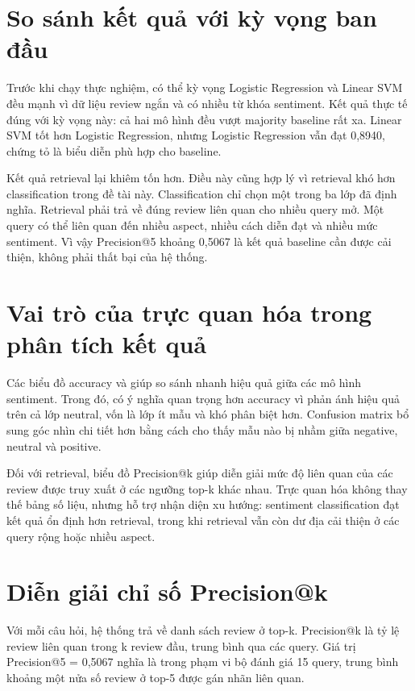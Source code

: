 \section{So sánh kết quả với kỳ vọng ban đầu}
Trước khi chạy thực nghiệm, có thể kỳ vọng Logistic Regression và Linear SVM đều mạnh vì dữ liệu review ngắn và có nhiều từ khóa sentiment. Kết quả thực tế đúng với kỳ vọng này: cả hai mô hình đều vượt majority baseline rất xa. Linear SVM tốt hơn Logistic Regression, nhưng Logistic Regression vẫn đạt \MacroFOne{} 0,8940, chứng tỏ \TFIDF{} là biểu diễn phù hợp cho baseline.

Kết quả retrieval lại khiêm tốn hơn. Điều này cũng hợp lý vì retrieval khó hơn classification trong đề tài này. Classification chỉ chọn một trong ba lớp đã định nghĩa. Retrieval phải trả về đúng review liên quan cho nhiều query mở. Một query có thể liên quan đến nhiều aspect, nhiều cách diễn đạt và nhiều mức sentiment. Vì vậy Precision@5 khoảng 0,5067 là kết quả baseline cần được cải thiện, không phải thất bại của hệ thống.

\section{Vai trò của trực quan hóa trong phân tích kết quả}
Các biểu đồ accuracy và \MacroFOne{} giúp so sánh nhanh hiệu quả giữa các mô hình sentiment. Trong đó, \MacroFOne{} có ý nghĩa quan trọng hơn accuracy vì phản ánh hiệu quả trên cả lớp neutral, vốn là lớp ít mẫu và khó phân biệt hơn. Confusion matrix bổ sung góc nhìn chi tiết hơn bằng cách cho thấy mẫu nào bị nhầm giữa negative, neutral và positive.

Đối với retrieval, biểu đồ Precision@k giúp diễn giải mức độ liên quan của các review được truy xuất ở các ngưỡng top-k khác nhau. Trực quan hóa không thay thế bảng số liệu, nhưng hỗ trợ nhận diện xu hướng: sentiment classification đạt kết quả ổn định hơn retrieval, trong khi retrieval vẫn còn dư địa cải thiện ở các query rộng hoặc nhiều aspect.

\section{Diễn giải chỉ số Precision@k}
Với mỗi câu hỏi, hệ thống trả về danh sách review ở top-k. Precision@k là tỷ lệ review liên quan trong k review đầu, trung bình qua các query. Giá trị Precision@5 = 0,5067 nghĩa là trong phạm vi bộ đánh giá 15 query, trung bình khoảng một nửa số review ở top-5 được gán nhãn liên quan.

